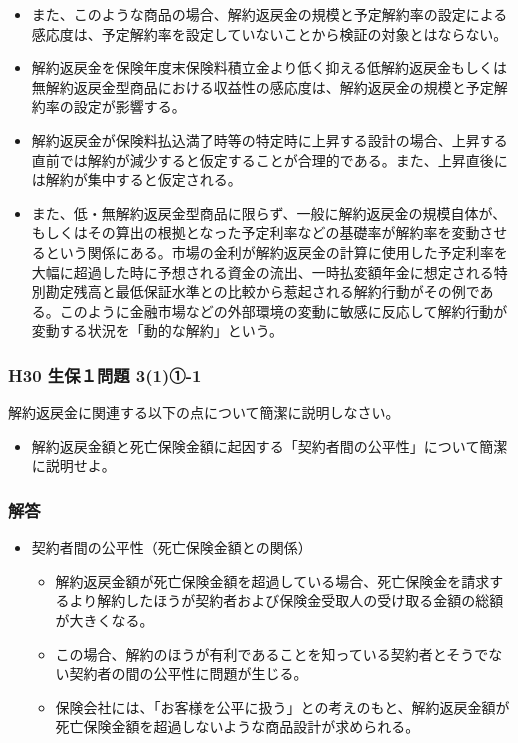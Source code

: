 \documentclass[report,gutter=10mm,fore-edge=10mm,uplatex,dvipdfmx]{jlreq}
\begin{document}
\begin{enumerate}
\begin{itemize}
  \item また、このような商品の場合、解約返戻金の規模と予定解約率の設定による感応度は、予定解約率を設定していないことから検証の対象とはならない。
  \item 解約返戻金を保険年度末保険料積立金より低く抑える低解約返戻金もしくは無解約返戻金型商品における収益性の感応度は、解約返戻金の規模と予定解約率の設定が影響する。
  \item 解約返戻金が保険料払込満了時等の特定時に上昇する設計の場合、上昇する直前では解約が減少すると仮定することが合理的である。また、上昇直後には解約が集中すると仮定される。
  \item また、低・無解約返戻金型商品に限らず、一般に解約返戻金の規模自体が、もしくはその算出の根拠となった予定利率などの基礎率が解約率を変動させるという関係にある。市場の金利が解約返戻金の計算に使用した予定利率を大幅に超過した時に予想される資金の流出、一時払変額年金に想定される特別勘定残高と最低保証水準との比較から惹起される解約行動がその例である。このように金融市場などの外部環境の変動に敏感に反応して解約行動が変動する状況を「動的な解約」という。
  \end{itemize}
\end{enumerate} 
\subsubsection{H30 生保１問題 3(1)①-1}
解約返戻金に関連する以下の点について簡潔に説明しなさい。
\begin{itemize}
\item 解約返戻金額と死亡保険金額に起因する「契約者間の公平性」について簡潔に説明せよ。
\end{itemize}

\subsubsection{解答}
\begin{itemize}
\item 契約者間の公平性（死亡保険金額との関係）
  \begin{itemize}
  \item 解約返戻金額が死亡保険金額を超過している場合、死亡保険金を請求するより解約したほうが契約者および保険金受取人の受け取る金額の総額が大きくなる。
  \item この場合、解約のほうが有利であることを知っている契約者とそうでない契約者の間の公平性に問題が生じる。
  \item 保険会社には、「お客様を公平に扱う」との考えのもと、解約返戻金額が死亡保険金額を超過しないような商品設計が求められる。  
  \end{itemize}
\end{itemize}
\end{document}
